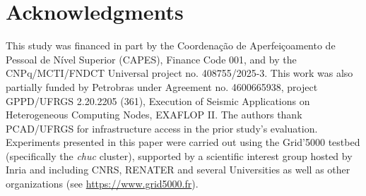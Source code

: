 \documentclass[12pt]{article}
\begin{document}
\section*{Acknowledgments}

This study was financed in part by the Coordenação de Aperfeiçoamento de Pessoal de Nível Superior (CAPES), Finance Code 001, and by the CNPq/MCTI/FNDCT Universal project no. 408755/2025-3. This work was also partially funded by Petrobras under Agreement no. 4600665938, project GPPD/UFRGS 2.20.2205 (361), Execution of Seismic Applications on Heterogeneous Computing Nodes, EXAFLOP II. The authors thank PCAD/UFRGS for infrastructure access in the prior study's evaluation. Experiments presented in this paper were carried out using the Grid'5000 testbed (specifically the \textit{chuc} cluster), supported by a scientific interest group hosted by Inria and including CNRS, RENATER and several Universities as well as other organizations (see \url{https://www.grid5000.fr}).

{\footnotesize
\let\oldthebibliography\thebibliography
\renewcommand\thebibliography[1]{%
  \oldthebibliography{#1}%
  \setlength{\itemsep}{0pt}%
  \setlength{\parsep}{0pt}%
}


}
\end{document}
